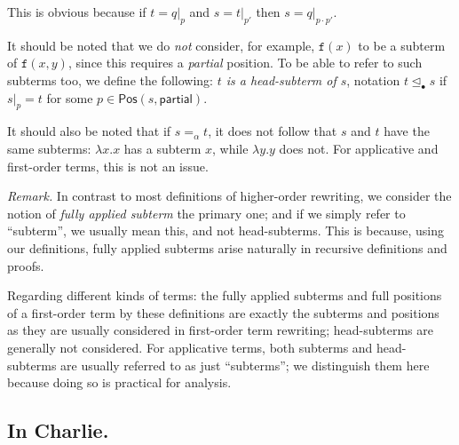 \documentclass{lmcs}
\theoremstyle{theorem}\newtheorem{theorem}{Theorem}
\theoremstyle{theorem}\newtheorem{lemma}[theorem]{Lemma}
\theoremstyle{theorem}\newtheorem{corollary}[theorem]{Corollary}
\theoremstyle{definition}\newtheorem{definition}[theorem]{Definition}
\theoremstyle{definition}\newtheorem{example}[theorem]{Example}
\newcommand{\Positions}{\mathsf{Pos}}
\newcommand{\identifier}[1]{\mathtt{#1}}
\newcommand{\afun}{\identifier{f}}
\newcommand{\abs}[2]{\lambda #1.#2}
\newcommand{\headsubtermeq}{\unlhd_{\bullet}}
\begin{document}
This is obvious because if $t = q|_p$ and $s = t|_{p'}$ then $s = q|_{p \cdot p'}$.

It should be noted that we do \emph{not} consider, for example, $\afun(x)$ to be
a subterm of $\afun(x,y)$, since this requires a \emph{partial} position.  To be
able to refer to such subterms too, we define the following: \emph{$t$ is a
head-subterm of $s$}, notation $t \headsubtermeq s$ if $s|_p = t$ for some $p
\in \Positions(s,\mathsf{partial})$.

It should also be noted that if $s =_\alpha t$, it does not follow that $s$ and
$t$ have the same subterms: $\abs{x}{x}$ has a subterm $x$, while $\abs{y}{y}$
does not.  For applicative and first-order terms, this is not an issue.

\emph{Remark.} In contrast to most definitions of higher-order rewriting, we
consider the notion of \emph{fully applied subterm} the primary one; and if we
simply refer to ``subterm'', we usually mean this, and not head-subterms.  This
is because, using our definitions, fully applied subterms arise naturally in
recursive definitions and proofs.

Regarding different kinds of terms: the fully applied subterms and full
positions of a first-order term by these definitions are exactly the subterms
and positions as they are usually considered in first-order term rewriting;
head-subterms are generally not considered.  For applicative terms, both
subterms and head-subterms are usually referred to as just ``subterms''; we
distinguish them here because doing so is practical for analysis.

\subsection*{In Charlie.}
\end{document}
